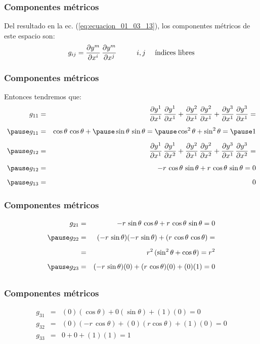 \documentclass[12pt]{beamer}
\begin{document}
\begin{frame}
\frametitle{Componentes métricos}
Del resultado en la ec. (\ref{eq:ecuacion_01_03_13}), los componentes métricos de este espacio son:
\pause
\begin{align*}
g_{ij} = \pdv{y^{m}}{x^{i}} \, \pdv{y^{m}}{x^{j}} \hspace{1cm} i, j \quad \mbox{ índices libres}
\end{align*}
\end{frame}
\begin{frame}
\frametitle{Componentes métricos}
Entonces tendremos que:
\pause
\begin{eqnarray*}
g_{11} &=& \pdv{y^{1}}{x^{1}} \, \pdv{y^{1}}{x^{1}} + \pdv{y^{2}}{x^{1}} \, \pdv{y^{2}}{x^{1}} + \pdv{y^{3}}{x^{1}} \, \pdv{y^{3}}{x^{1}} = \\[0.5em] \pause
g_{11} &=& \cos \theta \, \cos \theta + \pause \sin \theta \, \sin \theta = \pause \cos^{2} \theta + \sin^{2} \theta = \pause 1 \\[0.5em] \pause
g_{12} &=& \pdv{y^{1}}{x^{1}} \, \pdv{y^{1}}{x^{2}} + \pdv{y^{2}}{x^{1}} \, \pdv{y^{2}}{x^{2}} + \pdv{y^{3}}{x^{1}} \, \pdv{y^{3}}{x^{2}} = \\[0.5em] \pause
g_{12} &=& - r \, \cos \theta \, \sin \theta + r \, \cos \theta \, \sin \theta = 0 \\[0.5em] \pause
g_{13} &=& 0
\end{eqnarray*}
\end{frame}
\begin{frame}
\frametitle{Componentes métricos}
\begin{eqnarray*}
g_{21} &=& - r \, \sin \theta \, \cos \theta + r \, \cos \theta \, \sin \theta = 0 \\[0.5em] \pause
g_{22} &=& (-r \, \sin \theta)(- r \, \sin \theta) + (r \, \cos \theta \, \cos \theta) = \\[0.5em]
&=& r^{2} \, (\sin^{2} \theta + \cos \theta) = r^{2} \\[0.5em] \pause
g_{23} &=& (- r \, \sin \theta)(0) + (r \, \cos \theta)(0) + (0)(1) = 0 \\[0.5em]
\end{eqnarray*}
\end{frame}
\begin{frame}
\frametitle{Componentes métricos}
\begin{eqnarray*}
g_{31} &=& (0)(\cos \theta) + 0 (\sin \theta) + (1)(0) = 0 \\[0.5em]
g_{32} &=& (0)(- r \, \cos \theta) + (0)(r \cos \theta) + (1)(0) = 0 \\[0.5em]
g_{33} &=& 0 + 0 + (1)(1) = 1
\end{eqnarray*}
\end{frame}
\end{document}
